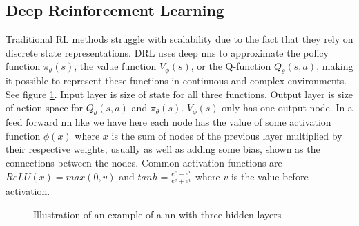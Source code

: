\documentclass[UKenglish]{uiomasterthesis}
\begin{document}
\subsection{Deep Reinforcement Learning}
Traditional RL methods struggle with scalability due to the fact that they rely on discrete state representations. DRL uses deep \acp{nn} to approximate the policy function $\pi_\theta(s)$, the value function $V_\phi(s)$, or the Q-function $Q_\theta(s,a)$, making it possible to represent these functions in continuous and complex environments. See figure \ref{fig:neural_network}. Input layer is size of state for all three functions. Output layer is size of action space for $Q_\theta(s,a)$ and $\pi_\theta(s)$. $V_\phi(s)$ only has one output node. In a feed forward \ac{nn} like we have here each node has the value of some activation function $\phi(x)$ where $x$ is the sum of nodes of the previous layer multiplied by their respective weights, usually as well as adding some bias, shown as the connections between the nodes. Common activation functions are $ReLU(x) = max(0,v)$ and $tanh=\frac{e^v-e^v}{e^v+e^v}$ where $v$ is the value before activation.
\begin{figure}[H]
    \begin{center}
    \end{center}
    \caption{Illustration of an example of a \ac{nn} with three hidden layers}
    \label{fig:neural_network}
\end{figure}
\end{document}
